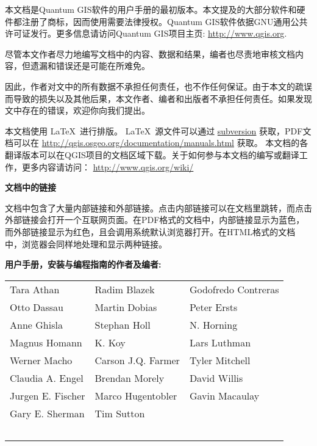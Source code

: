 \frontmatter
\pagestyle{scrplain}
\vspace{1cm}


本文档是Quantum GIS软件的用户手册的最初版本。本文提及的大部分软件和硬件都注册了商标，因而使用需要法律授权。Quantum GIS软件依据GNU通用公共许可证发行。更多信息请访问Quantum GIS项目主页:
\url{http://www.qgis.org}.
\par\bigskip
尽管本文作者尽力地编写文档中的内容、数据和结果，编者也尽责地审核文档内容，但遗漏和错误还是可能在所难免。
\par\bigskip
因此，作者对文中的所有数据不承担任何责任，也不作任何保证。由于本文的疏误而导致的损失以及其他后果，本文作者、编者和出版者不承担任何责任。如果发现文中存在的错误，欢迎你向我们提出。
\par\bigskip
本文档使用 \LaTeX~进行排版。 \LaTeX~源文件可以通过 \href{http://wiki.qgis.org/qgiswiki/DocumentationWritersCorner}{subversion} 
获取，PDF文档可以在 \url{http://qgis.osgeo.org/documentation/manuals.html} 获取。 
本文档的各翻译版本可以在QGIS项目的文档区域下载。关于如何参与本文档的编写或翻译工作，更多内容请访问： \url{http://www.qgis.org/wiki/} 

\vspace{1cm}
\noindent
\textbf{文档中的链接}
\par\bigskip
文档中包含了大量内部链接和外部链接。点击内部链接可以在文档里跳转，而点击外部链接会打开一个互联网页面。在PDF格式的文档中，内部链接显示为蓝色，而外部链接显示为红色，且会调用系统默认浏览器打开。在HTML格式的文档中，浏览器会同样地处理和显示两种链接。

\newpage

\begin{flushleft}
\textbf{用户手册，安装与编程指南的作者及编者:}
  \par\bigskip\noindent
\begin{tabular}{p{4cm} p{4cm} p{4cm}}
Tara Athan & Radim Blazek & Godofredo Contreras \\
Otto Dassau & Martin Dobias & Peter Ersts \\
Anne Ghisla & Stephan Holl & N. Horning \\
Magnus Homann & K. Koy & Lars Luthman \\ 
Werner Macho & Carson J.Q. Farmer & Tyler Mitchell \\
Claudia A. Engel & Brendan Morely & David Willis \\
Jurgen E. Fischer & Marco Hugentobler & Gavin Macaulay \\
Gary E. Sherman & Tim Sutton \\ \
\end{tabular}
\end{flushleft}

